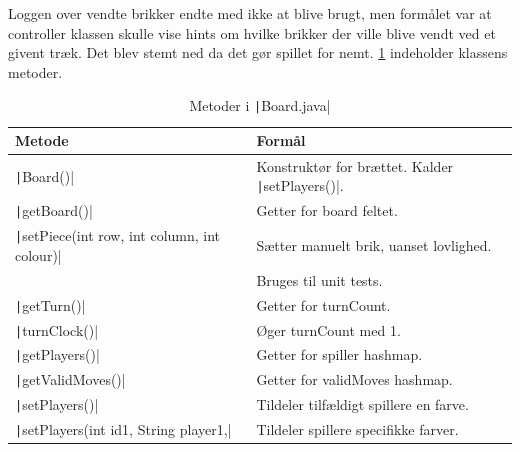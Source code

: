 Loggen over vendte brikker endte med ikke at blive brugt, men formålet var at controller klassen skulle vise hints om hvilke brikker der ville blive vendt ved et givent træk. Det blev stemt ned da det gør spillet for nemt.\newline
\cref{tbl:boardmethods} indeholder klassens metoder.
\begin{table}[H]
    \centering
    \caption{Metoder i \texttt|Board.java|}\label{tbl:boardmethods}
    \begin{tabular}{ll}
        \toprule
        Metode                                                        & Formål                                                                \\
        \midrule
        \texttt|Board()|                                    & Konstruktør for brættet. Kalder \texttt|setPlayers()|.      \\
        \texttt|getBoard()|                                 & Getter for board feltet.                                              \\
        \texttt|setPiece(int row, int column, int colour)|  & Sætter manuelt brik, uanset lovlighed.                                \\
                                                                      & Bruges til unit tests.                                                \\
        \texttt|getTurn()|                                  & Getter for turnCount.                                                 \\
        \texttt|turnClock()|                                & Øger turnCount med 1.                                                 \\
        \texttt|getPlayers()|                               & Getter for spiller hashmap.                                           \\
        \texttt|getValidMoves()|                            & Getter for validMoves hashmap.                                        \\
        \texttt|setPlayers()|                               & Tildeler tilfældigt spillere en farve.                                \\
        \texttt|setPlayers(int id1, String player1,|        & Tildeler spillere specifikke farver.                                  \\

\end{tabular}
\end{table}
